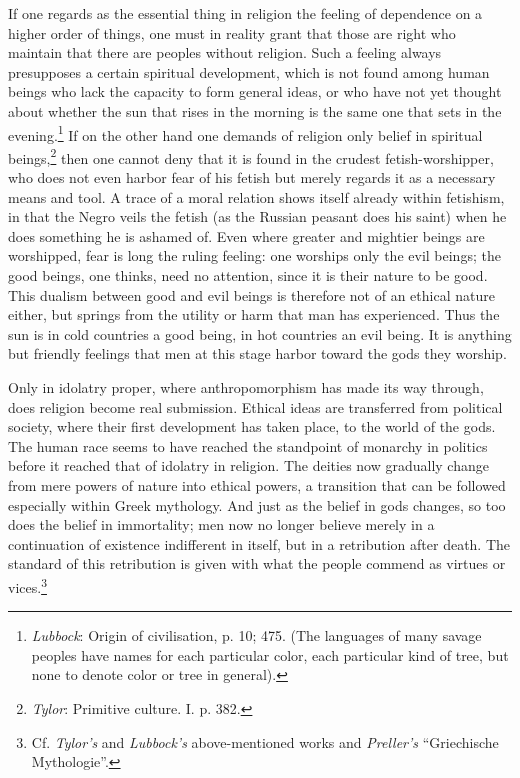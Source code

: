 \documentclass[12pt,a4paper,openany]{book}
\newcommand{\opage}[1]{\marginnote{\footnotesize\textit{[#1]}}}
\begin{document}
If one regards as the essential thing in religion the feeling of dependence on
a higher order of things, one must in reality grant that those are right who
maintain that there are peoples without religion. Such a feeling always
presupposes a certain spiritual development, which is not found among human
beings who lack the capacity to form general ideas, or who have not yet
thought about \opage{65}whether the sun that rises in the morning is the same
one that sets in the evening.\footnote[1]{\emph{Lubbock}: Origin of
civilisation, p. 10; 475. (The languages of many savage peoples have names for
each particular color, each particular kind of tree, but none to denote color
or tree in general).} If on the other hand one demands of religion only belief
in spiritual beings,\footnote[2]{\emph{Tylor}: Primitive culture. I. p. 382.}
then one cannot deny that it is found in the crudest fetish-worshipper, who
does not even harbor fear of his fetish but merely regards it as a necessary
means and tool. A trace of a moral relation shows itself already within
fetishism, in that the Negro veils the fetish (as the Russian peasant does his
saint) when he does something he is ashamed of. Even where greater and
mightier beings are worshipped, fear is long the ruling feeling: one worships
only the evil beings; the good beings, one thinks, need no attention, since it
is their nature to be good. This dualism between good and evil beings is
therefore not of an ethical nature either, but springs from the utility or
harm that man has experienced. Thus the sun is in cold countries a good being,
in hot countries an evil being. It is anything but friendly feelings that men
at this stage harbor toward the gods they worship.

Only in idolatry proper, where anthropomorphism has made its way through, does
religion become real submission. Ethical ideas are transferred from political
society, where their \opage{66}first development has taken place, to the world
of the gods. The human race seems to have reached the standpoint of monarchy
in politics before it reached that of idolatry in religion. The deities now
gradually change from mere powers of nature into ethical powers, a transition
that can be followed especially within Greek mythology. And just as the belief
in gods changes, so too does the belief in immortality; men now no longer
believe merely in a continuation of existence indifferent in itself, but in a
retribution after death. The standard of this retribution is given with what
the people commend as virtues or vices.\footnote[1]{Cf. \emph{Tylor's} and
\emph{Lubbock's} above-mentioned works and \emph{Preller's} ``Griechische
Mythologie''.}
\end{document}
